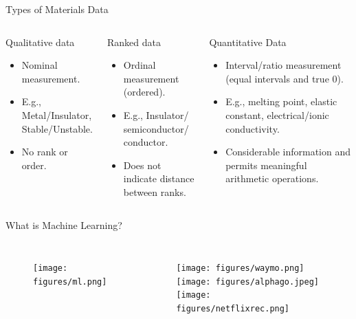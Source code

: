 \documentclass[aspectratio=169]{beamer}
\begin{document}
    \begin{frame}[t]{Types of Materials Data}
        \begin{columns}[t]
            \begin{exampleblock}{Qualitative data}
                \begin{itemize}
                    \item Nominal measurement.
                    \item E.g., Metal/Insulator, Stable/Unstable.
                    \item No rank or order.
                \end{itemize}
            \end{exampleblock}
            \begin{exampleblock}{Ranked data}
                \begin{itemize}
                    \item Ordinal measurement (ordered).
                    \item E.g., Insulator/ semiconductor/ conductor.
                    \item Does not indicate distance between ranks.
                \end{itemize}
            \end{exampleblock}
            \begin{exampleblock}{Quantitative Data
            }
                \begin{itemize}
                    \item Interval/ratio measurement (equal intervals and true 0).
                    \item E.g., melting point, elastic constant, electrical/ionic conductivity.
                    \item Considerable information and permits meaningful arithmetic operations.
                \end{itemize}
            \end{exampleblock}
        \end{columns}
    \end{frame}

    \begin{frame}{What is Machine Learning?}
        \begin{columns}
            \begin{figure}
                \centering
                \texttt{[image: figures/ml.png]}
            \end{figure}
            \begin{figure}
                \centering
                \texttt{[image: figures/waymo.png]}
                \texttt{[image: figures/alphago.jpeg]}
                \texttt{[image: figures/netflixrec.png]}
            \end{figure}
        \end{columns}


    \end{frame}
\end{document}
